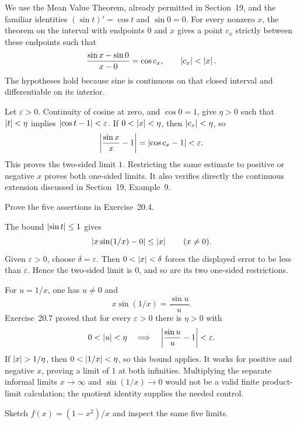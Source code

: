 We use the Mean Value Theorem, already permitted in Section~19,
and the familiar identities $(\sin t)'=\cos t$ and $\sin0=0$.
For every nonzero $x$, the theorem on the interval with endpoints
$0$ and $x$ gives a point $c_x$ strictly between these endpoints
such that
\[
 \frac{\sin x-\sin0}{x-0}=\cos c_x,
 \qquad \left|c_x\right|<\left|x\right|.
\]
The hypotheses hold because sine is continuous on that closed
interval and differentiable on its interior.

Let $\varepsilon>0$. Continuity of cosine at zero, and $\cos0=1$,
give $\eta>0$ such that $\left|t\right|<\eta$ implies
$\left|\cos t-1\right|<\varepsilon$. If $0<\left|x\right|<\eta$, then
$\left|c_x\right|<\eta$, so
\[
 \left|\frac{\sin x}{x}-1\right|
 =\left|\cos c_x-1\right|<\varepsilon.
\]
This proves the two-sided limit $1$. Restricting the same
estimate to positive or negative $x$ proves both one-sided limits.
It also verifies directly the continuous extension discussed in
Section~19, Example~9.

\goal Prove the five assertions in Exercise~20.4.

The bound $\left|\sin t\right|\le1$ gives
\[
 \left|x\sin(1/x)-0\right|\le\left|x\right|\qquad(x\ne0).
\]
Given $\varepsilon>0$, choose $\delta=\varepsilon$.
Then $0<\left|x\right|<\delta$ forces the displayed error to be less
than $\varepsilon$. Hence the two-sided limit is $0$, and so
are its two one-sided restrictions.

For $u=1/x$, one has $u\ne0$ and
\[
 x\sin(1/x)=\frac{\sin u}{u}.
\]
Exercise~20.7 proved that for every $\varepsilon>0$ there is
$\eta>0$ with
\[
 0<\left|u\right|<\eta\quad\Longrightarrow\quad
 \left|\frac{\sin u}{u}-1\right|<\varepsilon.
\]
If $\abs{x}>1/\eta$, then $0<\left|1/x\right|<\eta$, so this bound
applies. It works for positive and negative $x$, proving a limit
of $1$ at both infinities. Multiplying the separate informal
limits $x\to\infty$ and $\sin(1/x)\to0$ would not be a valid
finite product-limit calculation; the quotient identity supplies
the needed control.

\goal Sketch $f(x)=(1-x^2)/x$ and inspect the same five limits.

